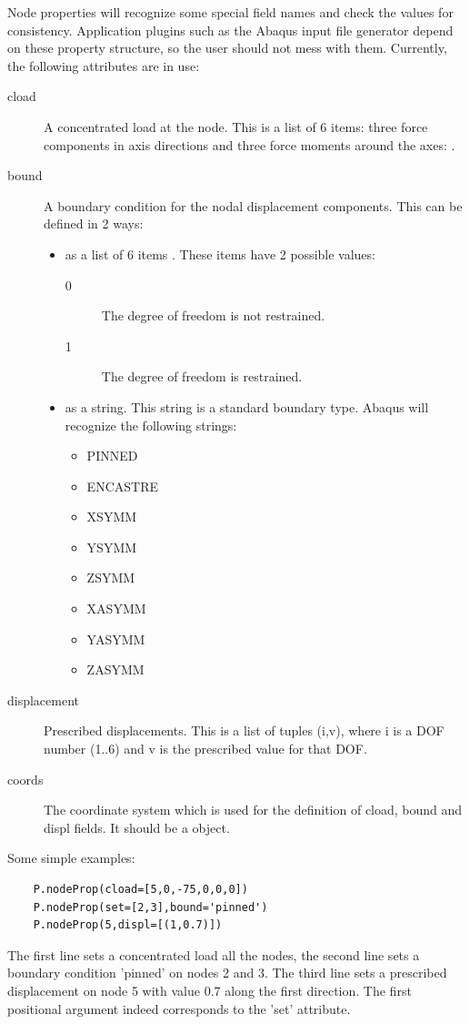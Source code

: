 {{{Node properties will recognize some special field names and check the values for consistency. Application plugins such as the Abaqus input file generator depend on these property structure, so the user should not mess with them. Currently, the following attributes are in use:
\begin{description}
 \item [cload] A concentrated load at the node. This is a list of 6 items: three force components in axis directions and three force moments around the axes: \Code{[F_0, F_1, F_2, M_0, M_1, M_2]}. 
 \item [bound] A boundary condition for the nodal displacement components. This can be defined in 2 ways:
     \begin{itemize}
     \item as a list of 6 items \Code{[ u_0, u_1, u_2, r_0, r_1, r_2 ]}. These items have 2 possible values:
         \begin{description}
         \item [0] The degree of freedom is not restrained.
         \item [1] The degree of freedom is restrained.
         \end{description}
     \item as a string. This string is a standard boundary type. Abaqus will recognize the following strings:
         \begin{itemize}
         \item PINNED 
         \item ENCASTRE
         \item XSYMM
         \item YSYMM
         \item ZSYMM
         \item XASYMM
         \item YASYMM 
         \item ZASYMM
         \end{itemize} 
     \end{itemize}
 \item [displacement] Prescribed displacements. This is a list of tuples (i,v), where i is a DOF number (1..6) and v is the prescribed value for that DOF. 
 \item [coords] The coordinate system which is used for the definition of cload, bound and displ fields. It should be a  object.
\end{description}

Some simple examples:
\begin{verbatim}
    P.nodeProp(cload=[5,0,-75,0,0,0])
    P.nodeProp(set=[2,3],bound='pinned')
    P.nodeProp(5,displ=[(1,0.7)])
\end{verbatim}
The first line sets a concentrated load all the nodes, the second line sets a boundary condition 'pinned' on nodes 2 and 3. The third line sets a prescribed displacement on node 5 with value 0.7 along the first direction.
The first positional argument indeed corresponds to the 'set' attribute.

}}}
